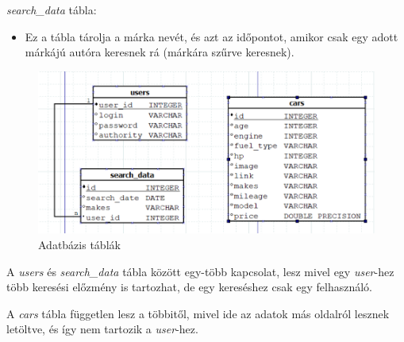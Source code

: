 \textit{search\_data} tábla:
\begin{itemize}
\item Ez a tábla tárolja a márka nevét, és azt az időpontot, amikor csak egy adott márkájú autóra keresnek rá (márkára szűrve keresnek).
\end{itemize}
 
 \begin{figure}[h]
\centering
\includegraphics[scale=0.6]{images/Data_Table.png}
\caption{Adatbázis táblák}
\label{fig:DataTable}
\end{figure}

A \textit{users} és \textit{search\_data} tábla között egy-több kapcsolat, lesz mivel egy \textit{user}-hez több keresési előzmény is tartozhat, de egy kereséshez csak egy felhasználó.

A \textit{cars} tábla független lesz a többitől, mivel ide az adatok más oldalról lesznek letöltve, és így nem tartozik a \textit{user}-hez.

